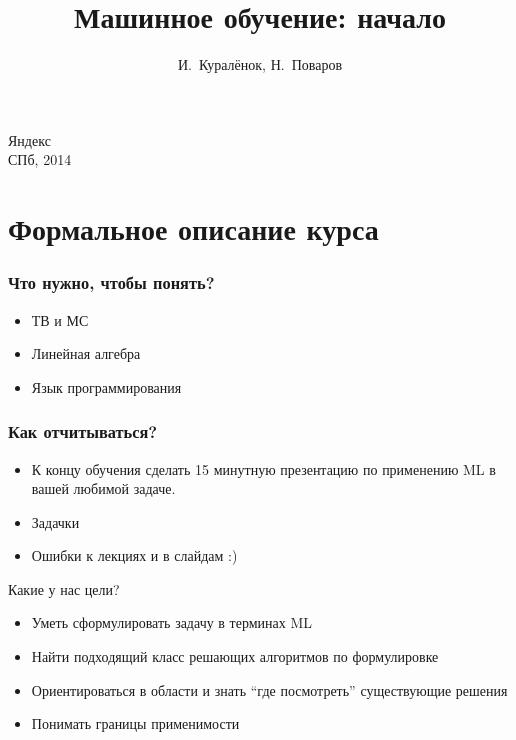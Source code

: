 \documentclass[14pt, fleqn, xcolor={dvipsnames, table}]{beamer}
\title{Машинное обучение: начало\\\small{}}
\author[]{\small{%
И.~Куралёнок,
Н.~Поваров}}
\date{}
\begin{document}
\begin{frame}
\maketitle
\small
\begin{center}
\vspace{-60pt}
\normalsize {\color{red}Я}ндекс \\
\vspace{80pt}
\footnotesize СПб, 2014
\end{center}
\end{frame}

\section{Формальное описание курса}

\begin{frame}
\frametitle{Что нужно, чтобы понять?}
\begin{itemize}
	\item ТВ и МС
	\item Линейная алгебра
	\item Язык программирования
\end{itemize}
\end{frame}

\begin{frame}
\frametitle{Как отчитываться?}
\begin{itemize}
\item К концу обучения сделать 15 минутную презентацию по применению ML в вашей любимой задаче.
\item Задачки
\item Ошибки к лекциях и в слайдам :)
\end{itemize}
\end{frame}

\begin{frame}{Какие у нас цели?}
\begin{itemize}
	\item Уметь сформулировать задачу в терминах ML
	\item Найти подходящий класс решающих алгоритмов по формулировке
	\item Ориентироваться в области и знать ``где посмотреть'' существующие решения
	\item Понимать границы применимости
\end{itemize}
\end{frame}
\end{document}
